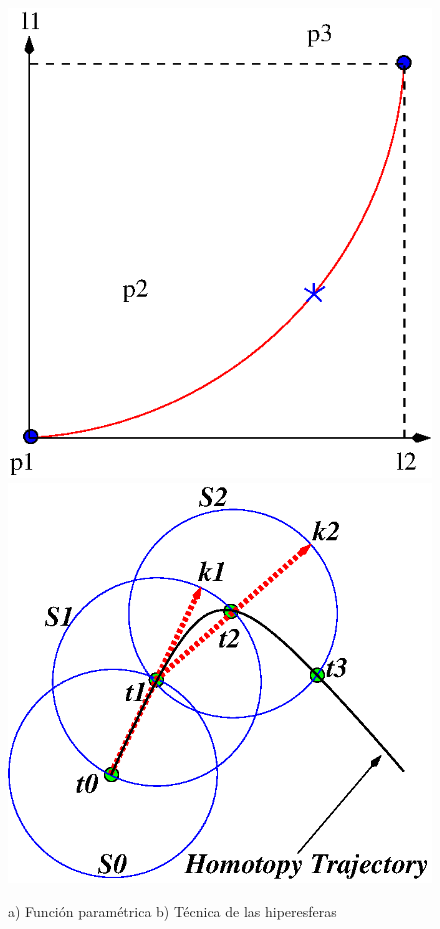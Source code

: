 \documentclass[conference,letterpaper,twocolumn]{IEEEtran}
\begin{document}
\begin{figure}[hbtp]
\centering
\includegraphics[scale=0.4]{fig/curvasl.eps}
\hspace{5mm}
\includegraphics[scale=0.4]{fig/hiper.eps}
\caption{a) Función paramétrica b) Técnica de las hiperesferas}
\label{curvasl}
\end{figure}
\end{document}
